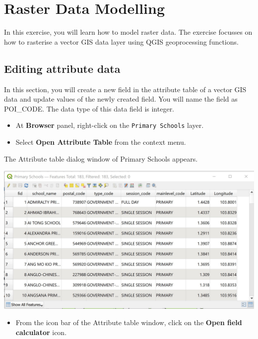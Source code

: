 \documentclass[
  letterpaper,
  DIV=11,
  numbers=noendperiod]{scrreprt}
\providecommand{\tightlist}{%
  \setlength{\itemsep}{0pt}\setlength{\parskip}{0pt}}\usepackage{longtable,booktabs,array}
\begin{document}
\hypertarget{raster-data-modelling}{%
\section{Raster Data Modelling}\label{raster-data-modelling}}

In this exercise, you will learn how to model raster data. The exercise
focusses on how to rasterise a vector GIS data layer using QGIS
geoprocessing functions.

\hypertarget{editing-attribute-data}{%
\subsection{Editing attribute data}\label{editing-attribute-data}}

In this section, you will create a new field in the attribute table of a
vector GIS data and update values of the newly created field. You will
name the field as POI\_CODE. The data type of this data field is
integer.

\begin{itemize}
\tightlist
\item
  At \textbf{Browser} panel, right-click on the
  \texttt{Primary\ Schools} layer.
\item
  Select \textbf{Open Attribute Table} from the context menu.
\end{itemize}

The Attribute table dialog window of Primary Schools appears.

\includegraphics{./img06/image2.jpg}

\begin{itemize}
\tightlist
\item
  From the icon bar of the Attribute table window, click on the
  \textbf{Open field calculator} icon.
\end{itemize}
\end{document}
